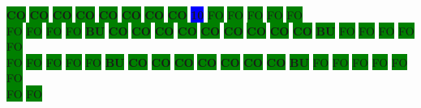 \colorbox{green}{\color[rgb]{0,0,0}\textbf{CO}}%
\colorbox{green}{\color[rgb]{0,0,0}\textbf{CO}}%
\colorbox{green}{\color[rgb]{0,0,0}\textbf{CO}}%
\colorbox{green}{\color[rgb]{0,0,0}\textbf{CO}}%
\colorbox{green}{\color[rgb]{0,0,0}\textbf{CO}}%
\colorbox{green}{\color[rgb]{0,0,0}\textbf{CO}}%
\colorbox{green}{\color[rgb]{0,0,0}\textbf{CO}}%
\colorbox{green}{\color[rgb]{0,0,0}\textbf{CO}}%
\colorbox{blue}{\color[rgb]{1,0,0}\textbf{10}}%
\colorbox{green}{\color[gray]{0.75}FO}%
\colorbox{green}{\color[gray]{0.75}FO}%
\colorbox{green}{\color[gray]{0.75}FO}%
\colorbox{green}{\color[gray]{0.75}FO}%
\colorbox{green}{\color[gray]{0.75}FO}%
\\
\colorbox{green}{\color[gray]{0.75}FO}%
\colorbox{green}{\color[gray]{0.75}FO}%
\colorbox{green}{\color[gray]{0.75}FO}%
\colorbox{green}{\color[gray]{0.75}FO}%
\colorbox{green}{\color[rgb]{1,0,0}\textbf{BU}}%
\colorbox{green}{\color[rgb]{0,0,0}\textbf{CO}}%
\colorbox{green}{\color[rgb]{0,0,0}\textbf{CO}}%
\colorbox{green}{\color[rgb]{0,0,0}\textbf{CO}}%
\colorbox{green}{\color[rgb]{0,0,0}\textbf{CO}}%
\colorbox{green}{\color[rgb]{0,0,0}\textbf{CO}}%
\colorbox{green}{\color[rgb]{0,0,0}\textbf{CO}}%
\colorbox{green}{\color[rgb]{0,0,0}\textbf{CO}}%
\colorbox{green}{\color[rgb]{0,0,0}\textbf{CO}}%
\colorbox{green}{\color[rgb]{0,0,0}\textbf{CO}}%
\colorbox{green}{\color[rgb]{1,0,0}\textbf{BU}}%
\colorbox{green}{\color[gray]{0.75}FO}%
\colorbox{green}{\color[gray]{0.75}FO}%
\colorbox{green}{\color[gray]{0.75}FO}%
\colorbox{green}{\color[gray]{0.75}FO}%
\colorbox{green}{\color[gray]{0.75}FO}%
\\
\colorbox{green}{\color[gray]{0.75}FO}%
\colorbox{green}{\color[gray]{0.75}FO}%
\colorbox{green}{\color[gray]{0.75}FO}%
\colorbox{green}{\color[gray]{0.75}FO}%
\colorbox{green}{\color[gray]{0.75}FO}%
\colorbox{green}{\color[rgb]{1,0,0}\textbf{BU}}%
\colorbox{green}{\color[rgb]{0,0,0}\textbf{CO}}%
\colorbox{green}{\color[rgb]{0,0,0}\textbf{CO}}%
\colorbox{green}{\color[rgb]{0,0,0}\textbf{CO}}%
\colorbox{green}{\color[rgb]{0,0,0}\textbf{CO}}%
\colorbox{green}{\color[rgb]{0,0,0}\textbf{CO}}%
\colorbox{green}{\color[rgb]{0,0,0}\textbf{CO}}%
\colorbox{green}{\color[rgb]{0,0,0}\textbf{CO}}%
\colorbox{green}{\color[rgb]{1,0,0}\textbf{BU}}%
\colorbox{green}{\color[gray]{0.75}FO}%
\colorbox{green}{\color[gray]{0.75}FO}%
\colorbox{green}{\color[gray]{0.75}FO}%
\colorbox{green}{\color[gray]{0.75}FO}%
\colorbox{green}{\color[gray]{0.75}FO}%
\colorbox{green}{\color[gray]{0.75}FO}%
\\
\colorbox{green}{\color[gray]{0.75}FO}%
\colorbox{green}{\color[gray]{0.75}FO}%
